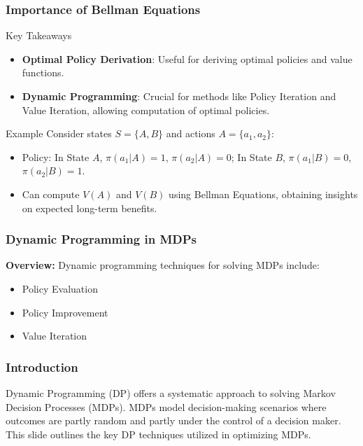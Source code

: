 \documentclass[aspectratio=169]{beamer}
\begin{document}
\begin{frame}[fragile]
    \frametitle{Importance of Bellman Equations}
    \begin{block}{Key Takeaways}
        \begin{itemize}
            \item \textbf{Optimal Policy Derivation}: Useful for deriving optimal policies and value functions.
            \item \textbf{Dynamic Programming}: Crucial for methods like Policy Iteration and Value Iteration, allowing computation of optimal policies.
        \end{itemize}
    \end{block}

    \begin{block}{Example}
        Consider states \( S = \{A, B\} \) and actions \( A = \{a_1, a_2\} \):
        \begin{itemize}
            \item Policy: In State \(A\), \(\pi(a_1|A) = 1\), \(\pi(a_2|A) = 0\); In State \(B\), \(\pi(a_1|B) = 0\), \(\pi(a_2|B) = 1\).
            \item Can compute \(V(A)\) and \(V(B)\) using Bellman Equations, obtaining insights on expected long-term benefits.
        \end{itemize}
    \end{block}
\end{frame}

\begin{frame}[fragile]
  \frametitle{Dynamic Programming in MDPs}
  \textbf{Overview:} Dynamic programming techniques for solving MDPs include:
  \begin{itemize}
    \item Policy Evaluation
    \item Policy Improvement
    \item Value Iteration
  \end{itemize}
\end{frame}

\begin{frame}[fragile]
  \frametitle{Introduction}
  Dynamic Programming (DP) offers a systematic approach to solving Markov Decision Processes (MDPs). MDPs model decision-making scenarios where outcomes are partly random and partly under the control of a decision maker. This slide outlines the key DP techniques utilized in optimizing MDPs.
\end{frame}
\end{document}
